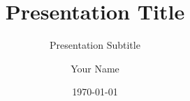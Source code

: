\author{Your Name}
\title{Presentation Title}
\subtitle{Presentation Subtitle}

\date{\today}

\subject{Presentation Title}

